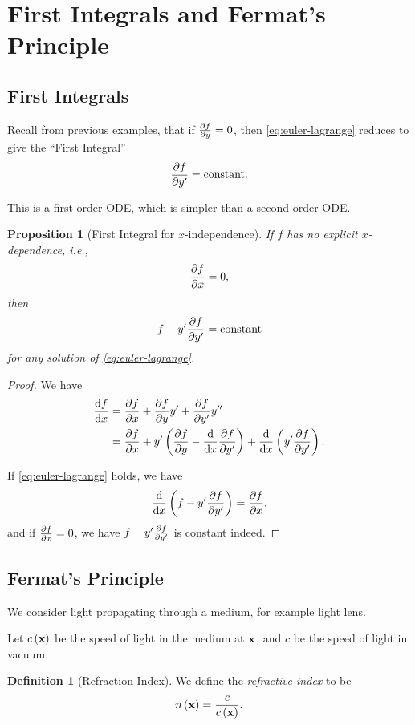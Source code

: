 \documentclass[11pt]{article}
\numberwithin{equation}{section}
\newtheorem{proposition}[theorem]{Proposition}
\theoremstyle{definition}
\newtheorem{definition}[theorem]{Definition}
\theoremstyle{remark}
\newcommand{\pqty}[1]{\left(#1\right)}
\begin{document}
\section{First Integrals and Fermat's Principle}

\subsection{First Integrals}

Recall from previous examples, that if \(\pdv*{f}{y} = 0\), then \autoref{eq:euler-lagrange} reduces to give the ``First Integral''
\[
    \pdv{f}{y'} = \text{constant}.
\]

This is a first-order ODE, which is simpler than a second-order ODE.

\begin{proposition}[First Integral for \(x\)-independence]\label{variation-unit-0045}
    \label{prop:first-integral-x-inidependence}%
    If \(f\) has no explicit \(x\)-dependence, i.e.,
    \[
        \pdv{f}{x} = 0,
    \]
    then
    \[
        f - y' \pdv{f}{y'} = \text{constant}
    \]
    for any solution of \autoref{eq:euler-lagrange}.
\end{proposition}

\begin{proof}
    We have
    \begin{align*}
        \dv{f}{x} &= \pdv{f}{x} + \pdv{f}{y} y' + \pdv{f}{y'} y'' \\
        &= \pdv{f}{x} + y' \pqty{\pdv{f}{y} - \dv{x} \pdv{f}{y'}} + \dv{x} \pqty{y' \pdv{f}{y'}}.
    \end{align*}

    If \autoref{eq:euler-lagrange} holds, we have
    \[
        \dv{x} \pqty{f - y' \pdv{f}{y'}} = \pdv{f}{x},
    \]
    and if \(\pdv*{f}{x} = 0\), we have \(f - y' \pdv*{f}{y'}\) is constant indeed.
\end{proof}

\subsection{Fermat's Principle}

We consider light propagating through a medium, for example light lens.

Let \(c\pqty{\vb{x}}\) be the speed of light in the medium at \(\vb{x}\), and \(c\) be the speed of light in vacuum.

\begin{definition}[Refraction Index]\label{variation-unit-0046}
    We define the \emph{refractive index} to be
    \[
        n\pqty{\vb{x}} = \frac{c}{c\pqty{\vb{x}}}.
    \]
\end{definition}
\end{document}
